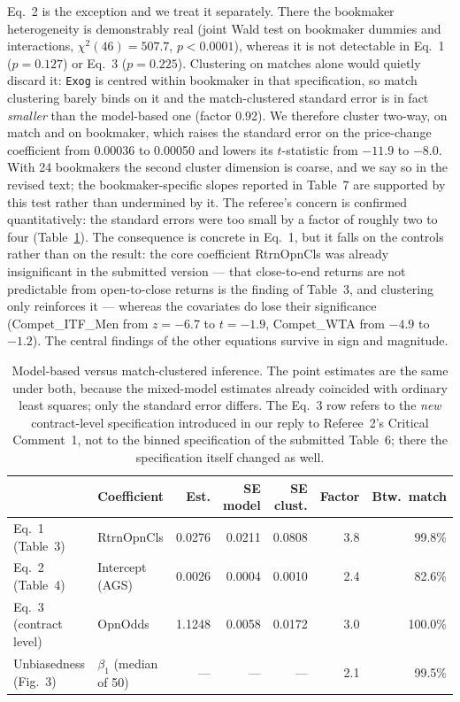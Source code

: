 \documentclass[letterpaper,12pt]{article}
\newcounter{b}
\begin{document}
\begin{enumerate}
{Eq.~2 is the exception and we treat it separately. There the bookmaker heterogeneity is demonstrably real (joint Wald test on bookmaker dummies and interactions, $\chi^2(46) = 507.7$, $p < 0.0001$), whereas it is not detectable in Eq.~1 ($p = 0.127$) or Eq.~3 ($p = 0.225$). Clustering on matches alone would quietly discard it: \texttt{Exog} is centred within bookmaker in that specification, so match clustering barely binds on it and the match-clustered standard error is in fact \emph{smaller} than the model-based one (factor 0.92). We therefore cluster two-way, on match and on bookmaker, which raises the standard error on the price-change coefficient from 0.00036 to 0.00050 and lowers its $t$-statistic from $-11.9$ to $-8.0$. With 24 bookmakers the second cluster dimension is coarse, and we say so in the revised text; the bookmaker-specific slopes reported in Table~7 are supported by this test rather than undermined by it. The referee's concern is confirmed quantitatively: the standard errors were too small by a factor of roughly two to four (Table~\ref{tab:r1c2}). The consequence is concrete in Eq.~1, but it falls on the controls rather than on the result: the core coefficient RtrnOpnCls was already insignificant in the submitted version --- that close-to-end returns are not predictable from open-to-close returns is the finding of Table~3, and clustering only reinforces it --- whereas the covariates do lose their significance (Compet\_ITF\_Men from $z = -6.7$ to $t = -1.9$, Compet\_WTA from $-4.9$ to $-1.2$). The central findings of the other equations survive in sign and magnitude.

\begin{table}[H]
\centering
\caption{Model-based versus match-clustered inference. The point estimates are the same under both, because the mixed-model estimates already coincided with ordinary least squares; only the standard error differs. The Eq.~3 row refers to the \emph{new} contract-level specification introduced in our reply to Referee~2's Critical Comment~1, not to the binned specification of the submitted Table~6; there the specification itself changed as well.}
\label{tab:r1c2}
\small
\setlength{\tabcolsep}{4pt}
\begin{tabular}{llrrrrr}
\toprule
 & Coefficient & Est. & SE model & SE clust. & Factor & Btw.\ match \\
\midrule
Eq.~1 (Table~3)       & RtrnOpnCls               & 0.0276 & 0.0211 & 0.0808 & 3.8 & 99.8\% \\
Eq.~2 (Table~4)       & Intercept (AGS)          & 0.0026 & 0.0004 & 0.0010 & 2.4 & 82.6\% \\
Eq.~3 (contract level) & OpnOdds                 & 1.1248 & 0.0058 & 0.0172 & 3.0 & 100.0\% \\
Unbiasedness (Fig.~3) & $\beta_1$ (median of 50) & ---    & ---    & ---    & 2.1 & 99.5\% \\
\bottomrule
\end{tabular}
\end{table}
}


\end{enumerate}
\end{document}
